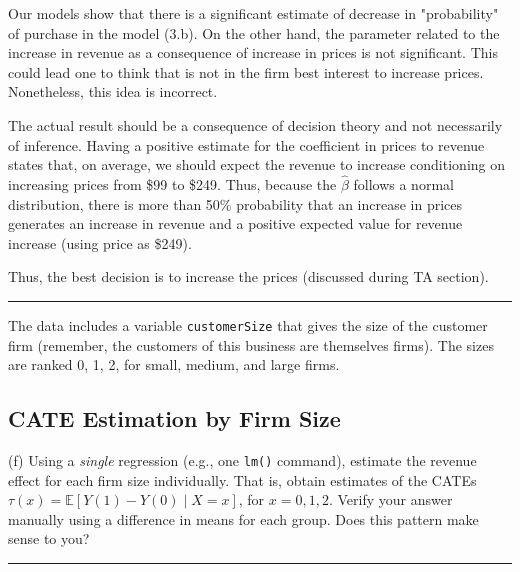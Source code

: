 \documentclass{article}
\newenvironment{colorparagraph}[1]{\par\color{#1}}{\par}
\begin{document}
Our models show that there is a significant estimate of decrease in "probability" of purchase in the model (3.b). On the other hand, the parameter related to the increase in revenue as a consequence of increase in prices is not significant. This could lead one to think that is not in the firm best interest to increase prices. Nonetheless, this idea is incorrect.

The actual result should be a consequence of decision theory and not necessarily of inference. Having a positive estimate for the coefficient in prices to revenue states that, on average, we should expect the revenue to increase conditioning on increasing prices from \$99 to \$249. Thus, because the $\hat{\beta}$ follows a normal distribution, there is more than 50\% probability that an increase in prices generates an increase in revenue and a positive expected value for revenue increase (using price as \$249).

Thus, the best decision is to increase the prices (discussed during TA section).

\begin{colorparagraph}{questioncolor}
\rule{\textwidth}{0.5pt}

The data includes a variable \texttt{customerSize} that gives the size of the customer firm (remember, the customers of this business are themselves firms). The sizes are ranked 0, 1, 2, for small, medium, and large firms.

\label{q3f}\subsection{CATE Estimation by Firm Size}
(f) Using a \emph{single} regression (e.g., one \texttt{lm()} command), estimate the revenue effect for each firm size individually. That is, obtain estimates of the CATEs \( \tau(x) = \mathbb{E}[Y(1) - Y(0) \mid X = x] \), for \( x = 0, 1, 2 \). Verify your answer manually using a difference in means for each group. Does this pattern make sense to you?

\rule{\textwidth}{0.5pt}
\end{colorparagraph}
\end{document}
